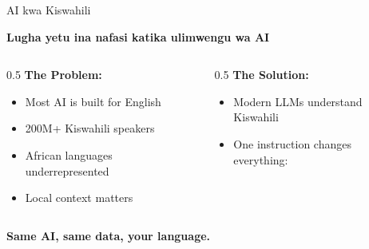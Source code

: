 \documentclass[aspectratio=169,12pt]{beamer}
\begin{document}
\begin{frame}{AI kwa Kiswahili}
\begin{center}
{\Large\textcolor{ubuntupurple}{\textbf{Lugha yetu ina nafasi katika ulimwengu wa AI}}}
\end{center}
\vspace{0.5cm}
\begin{columns}
\begin{column}{0.5\textwidth}
\textbf{The Problem:}
\begin{itemize}
\item Most AI is built for English
\item 200M+ Kiswahili speakers
\item African languages underrepresented
\item Local context matters
\end{itemize}
\end{column}
\begin{column}{0.5\textwidth}
\textbf{The Solution:}
\begin{itemize}
\item Modern LLMs understand Kiswahili
\item One instruction changes everything:
\end{itemize}
\vspace{0.3cm}
\begin{center}
\end{center}
\end{column}
\end{columns}
\vspace{0.5cm}
\begin{center}
\textbf{Same AI, same data, your language.}
\end{center}
\end{frame}
\end{document}
